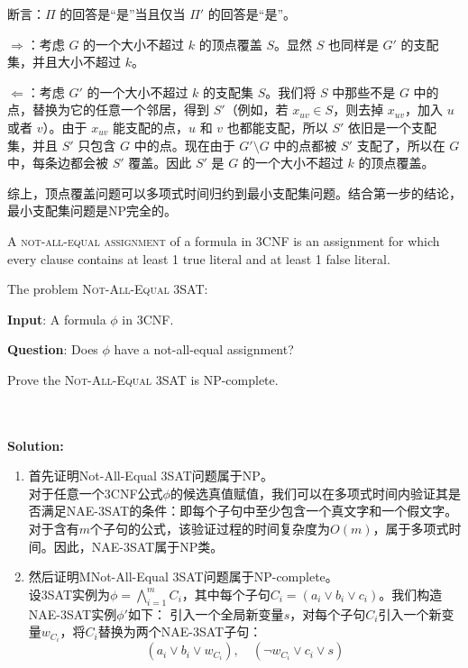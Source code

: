 \documentclass{article}
\newcounter{exercise}
\newcommand{\<}{
    \langle}
\renewcommand{\>}{
    \rangle}
\begin{document}
{\begin{enumerate}
    断言：$\Pi$ 的回答是“是”当且仅当 $\Pi'$ 的回答是“是”。

    \medskip
    \noindent $\Rightarrow$：考虑 $G$ 的一个大小不超过 $k$ 的顶点覆盖 $S$。显然 $S$ 也同样是 $G'$ 的支配集，并且大小不超过 $k$。

    \medskip
    \noindent $\Leftarrow$：考虑 $G'$ 的一个大小不超过 $k$ 的支配集 $S$。我们将 $S$ 中那些不是 $G$ 中的点，替换为它的任意一个邻居，得到 $S'$（例如，若 $x_{uv} \in S$，则去掉 $x_{uv}$，加入 $u$ 或者 $v$）。由于 $x_{uv}$ 能支配的点，$u$ 和 $v$ 也都能支配，所以 $S'$ 依旧是一个支配集，并且 $S'$ 只包含 $G$ 中的点。现在由于 $G' \setminus G$ 中的点都被 $S'$ 支配了，所以在 $G$ 中，每条边都会被 $S'$ 覆盖。因此 $S'$ 是 $G$ 的一个大小不超过 $k$ 的顶点覆盖。

    \medskip
    综上，顶点覆盖问题可以多项式时间归约到最小支配集问题。结合第一步的结论，最小支配集问题是NP完全的。
\end{enumerate}

\begin{exercise}
A \textsc{not-all-equal assignment} of a formula in 3CNF is an assignment for which every clause
contains at least 1 true literal and at least 1 false literal.

The problem \textsc{Not-All-Equal 3SAT}:

{\bf Input}: A formula $\phi$ in 3CNF.

{\bf Question}: Does $\phi$ have a not-all-equal assignment?

Prove the \textsc{Not-All-Equal 3SAT} is  NP-complete.

\end{exercise}
\\\\
\noindent\textbf{Solution:}
\begin{enumerate}
    \item 首先证明Not-All-Equal 3SAT问题属于NP。\\
    对于任意一个3CNF公式$\phi$的候选真值赋值，我们可以在多项式时间内验证其是否满足NAE-3SAT的条件：即每个子句中至少包含一个真文字和一个假文字。对于含有$m$个子句的公式，该验证过程的时间复杂度为$O(m)$，属于多项式时间。因此，NAE-3SAT属于NP类。
    \item 然后证明MNot-All-Equal 3SAT问题属于NP-complete。\\
    设3SAT实例为$\phi = \bigwedge_{i=1}^m C_i$，其中每个子句$C_i = (a_i \lor b_i \lor c_i)$。我们构造NAE-3SAT实例$\phi'$如下：
    引入一个全局新变量$s$，对每个子句$C_i$引入一个新变量$w_{C_i}$，将$C_i$替换为两个NAE-3SAT子句：
    $$(a_i \lor b_i \lor w_{C_i}), \quad (\neg w_{C_i} \lor c_i \lor s)$$


\end{enumerate}}
\end{document}

